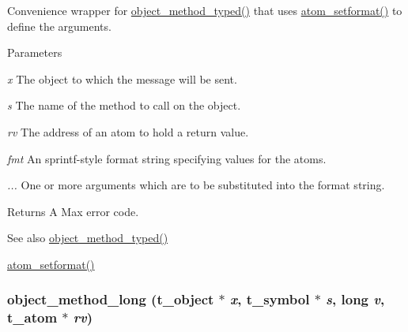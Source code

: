 Convenience wrapper for \hyperlink{group__obj_ga443dee482af22e0fe83e68955d367226}{object\_\-method\_\-typed()} that uses \hyperlink{group__atom_ga7a00fdf0699ae5176d39d7ddc3529bf0}{atom\_\-setformat()} to define the arguments. 
\begin{DoxyParams}{Parameters}
\item[{\em x}]The object to which the message will be sent. \item[{\em s}]The name of the method to call on the object. \item[{\em rv}]The address of an atom to hold a return value. \item[{\em fmt}]An sprintf-\/style format string specifying values for the atoms. \item[{\em ...}]One or more arguments which are to be substituted into the format string. \end{DoxyParams}
\begin{DoxyReturn}{Returns}
A Max error code.
\end{DoxyReturn}
\begin{DoxySeeAlso}{See also}
\hyperlink{group__obj_ga443dee482af22e0fe83e68955d367226}{object\_\-method\_\-typed()} 

\hyperlink{group__atom_ga7a00fdf0699ae5176d39d7ddc3529bf0}{atom\_\-setformat()} 
\end{DoxySeeAlso}
\hypertarget{group__obj_ga975e42fc3823dadc594232652291d26d}{
\subsubsection[{object\_\-method\_\-long}]{ object\_\-method\_\-long ({\bf t\_\-object} $\ast$ {\em x}, \/  {\bf t\_\-symbol} $\ast$ {\em s}, \/  long {\em v}, \/  {\bf t\_\-atom} $\ast$ {\em rv})}}
\label{group__obj_ga975e42fc3823dadc594232652291d26d}


